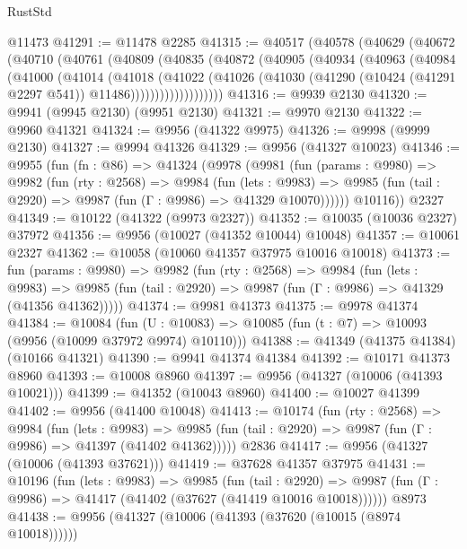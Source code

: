 \begin{lexlean}{RustStd}
\begin{coremodule}
    @11473
@41291 := @11478 @2285
@41315 := @40517
    (@40578
      (@40629
        (@40672
          (@40710
            (@40761
              (@40809
                (@40835
                  (@40872
                    (@40905
                      (@40934
                        (@40963
                          (@40984
                            (@41000
                              (@41014
                                (@41018
                                  (@41022
                                    (@41026
                                      (@41030
                                        (@41290
                                          (@10424 (@41291 @2297 @541))
                                          @11486)))))))))))))))))))
@41316 := @9939 @2130
@41320 := @9941 (@9945 @2130) (@9951 @2130)
@41321 := @9970 @2130
@41322 := @9960 @41321
@41324 := @9956 (@41322 @9975)
@41326 := @9998 (@9999 @2130)
@41327 := @9994 @41326
@41329 := @9956 (@41327 @10023)
@41346 := @9955
    (fun (fn : @86) =>
    @41324
      (@9978
        (@9981
          (fun (params : @9980) =>
          @9982
            (fun (rty : @2568) =>
            @9984
              (fun (lets : @9983) =>
              @9985 (fun (tail : @2920) => @9987 (fun (Γ : @9986) => @41329 @10070))))))
        @10116))
    @2327
@41349 := @10122 (@41322 (@9973 @2327))
@41352 := @10035 (@10036 @2327) @37972
@41356 := @9956 (@10027 (@41352 @10044) @10048)
@41357 := @10061 @2327
@41362 := @10058 (@10060 @41357 @37975 @10016 @10018)
@41373 := fun (params : @9980) =>
  @9982
    (fun (rty : @2568) =>
    @9984
      (fun (lets : @9983) =>
      @9985 (fun (tail : @2920) => @9987 (fun (Γ : @9986) => @41329 (@41356 @41362)))))
@41374 := @9981 @41373
@41375 := @9978 @41374
@41384 := @10084
    (fun (U : @10083) => @10085 (fun (t : @7) => @10093 (@9956 (@10099 @37972 @9974) @10110)))
@41388 := @41349 (@41375 @41384) (@10166 @41321)
@41390 := @9941 @41374 @41384
@41392 := @10171 @41373 @8960
@41393 := @10008 @8960
@41397 := @9956 (@41327 (@10006 (@41393 @10021)))
@41399 := @41352 (@10043 @8960)
@41400 := @10027 @41399
@41402 := @9956 (@41400 @10048)
@41413 := @10174
    (fun (rty : @2568) =>
    @9984
      (fun (lets : @9983) =>
      @9985 (fun (tail : @2920) => @9987 (fun (Γ : @9986) => @41397 (@41402 @41362)))))
    @2836
@41417 := @9956 (@41327 (@10006 (@41393 @37621)))
@41419 := @37628 @41357 @37975
@41431 := @10196
    (fun (lets : @9983) =>
    @9985
      (fun (tail : @2920) =>
      @9987 (fun (Γ : @9986) => @41417 (@41402 (@37627 (@41419 @10016 @10018))))))
    @8973
@41438 := @9956 (@41327 (@10006 (@41393 (@37620 (@10015 (@8974 @10018))))))

\end{coremodule}
\end{lexlean}
